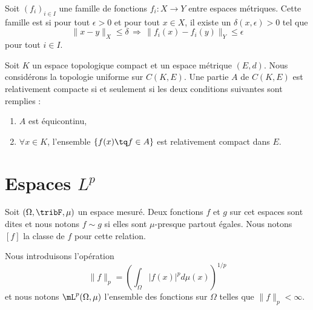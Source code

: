 \begin{definition}  \label{DefUWmVBcZ}
    Soit \( (f_i)_{i\in I}\) une famille de fonctions \( f_i\colon X\to Y\) entre espaces métriques. Cette famille est  si pour tout \( \epsilon>0\) et pour tout \( x\in X\), il existe un \( \delta(x,\epsilon)>0\) tel que 
    \begin{equation}
        \| x-y \|_X\leq \delta\,\Rightarrow\,\| f_i(x)-f_i(y) \|_Y\leq \epsilon
    \end{equation}
    pour tout \( i\in I\).
\end{definition}

\begin{theorem}        \label{ThoKRbtpah}
    Soit \( K\) un espace topologique compact et un espace métrique \( (E,d)\). Nous considérons la topologie uniforme sur \( C(K,E)\). Une partie \( A\) de \( C(K,E)\) est relativement compacte si et seulement si les deux conditions suivantes sont remplies :
    \begin{enumerate}
        \item
            \( A\) est équicontinu,
        \item
            \( \forall x\in K\), l'ensemble \( \{ f(x)\tq f\in A \}\) est relativement compact dans \( E\).
    \end{enumerate}
\end{theorem}

\section{Espaces \texorpdfstring{$L^p$}{Lp}}
\label{SecVKiVIQK}

Soit \( (\Omega,\tribF,\mu)\) un espace mesuré. Deux fonctions \( f\) et \( g\) sur cet espaces sont dites  et nous notons \( f\sim g\) si elles sont \( \mu\)-presque partout égales. Nous notons \( [f]\) la classe de \( f\) pour cette relation.

Nous introduisons l'opération
\begin{equation}
    \| f \|_p=\left( \int_{\Omega}| f(x) |^pd\mu(x) \right)^{1/p}
\end{equation}
et nous notons \( \mL^p(\Omega,\mu)\) l'ensemble des fonctions sur \( \Omega\) telles que \( \| f \|_p<\infty\).

